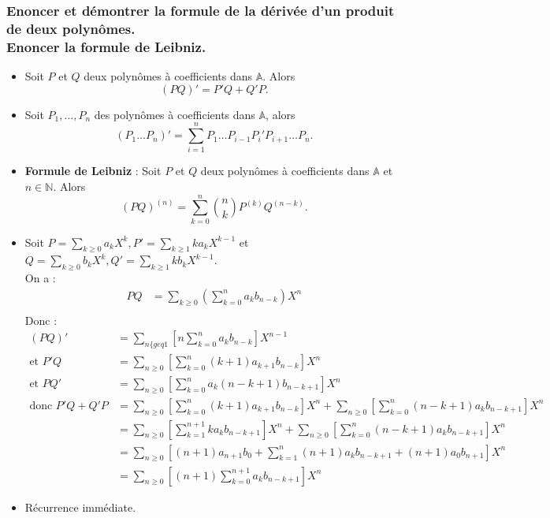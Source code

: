 \documentclass[titlepage, twoside]{report}
\begin{document}
\subsubsection{Enoncer et démontrer la formule de la dérivée d'un produit de deux polynômes. \\ Enoncer la formule de Leibniz. }
\begin{tcolorbox}[title=Propostion 13.26, title filled=false, colframe=lightblue, colback=lightblue!10!white]
    \begin{itemize}
        \item Soit $P$ et $Q$ deux polynômes à coefficients dans $\mathbb{A}$. Alors
        $$(PQ)' = P'Q + Q'P.$$

        \item Soit $P_1, \ldots, P_n$ des polynômes à coefficients dans $\mathbb{A}$, alors
        $$(P_1 \ldots P_n)' = \sum_{i=1}^{n} P_1 \ldots P_{i-1} P_i' P_{i+1} \ldots P_n.$$
    
        \item \textbf{Formule de Leibniz} : Soit $P$ et $Q$ deux polynômes à coefficients dans $\mathbb{A}$ et $n \in \mathbb{N}$. Alors
        $$(PQ)^{(n)} = \sum_{k=0}^{n} \binom{n}{k} P^{(k)} Q^{(n-k)}.$$
    \end{itemize}
\end{tcolorbox}

\begin{itemize}
    \item Soit $P = \sum\limits_{k \geq 0} a_k X^k, P' = \sum\limits_{k \geq 1} ka_kX^{k-1}$ et $Q = \sum\limits_{k \geq 0} b_k X^k, Q' = \sum\limits_{k \geq 1} kb_kX^{k-1}$. \\
    On a : 
    \begin{align*}
        PQ &= \sum_{k \geq 0} \left( \sum_{k=0}^{n} a_k b_{n-k} \right) X^n \\
    \end{align*}
    Donc : 
    \begin{align*}
        (PQ)' &= \sum_{n \{geq 1} \left[ n \sum_{k=0}^{n} a_k b_{n-k} \right] X^{n-1} \\
        \text{et } P'Q &= \sum_{n \geq 0} \left[ \sum_{k=0}^{n} (k+1)a_{k+1} b_{n-k} \right] X^n \\
        \text{et } PQ' &= \sum_{n \geq 0} \left[ \sum_{k=0}^{n} a_k (n-k+1)b_{n-k+1} \right] X^n \\
        \text{donc } P'Q + Q'P &= \sum_{n \geq 0} \left[ \sum_{k=0}^{n} (k+1)a_{k+1} b_{n-k} \right]X^n + \sum_{n \geq 0} \left[ \sum_{k=0}^{n} (n-k+1)a_k b_{n-k+1} \right] X^n \\
        &= \sum_{n \geq 0} \left[ \sum_{k=1}^{n+1} k a_{k} b_{n-k+1} \right] X^n + \sum_{n \geq 0} \left[ \sum_{k=0}^{n} (n-k+1) a_k b_{n-k+1} \right] X^n \\
        &= \sum_{n \geq 0} \left[ (n+1) a_{n+1} b_0 + \sum_{k=1}^{n} (n+1) a_k b_{n-k+1} + (n+1) a_0 b_{n+1} \right] X^n \\
        &= \sum_{n \geq 0} \left[ (n+1) \sum_{k=0}^{n+1} a_k b_{n-k+1} \right] X^n
    \end{align*}

    \item Récurrence immédiate. 
\end{itemize}
\end{document}
